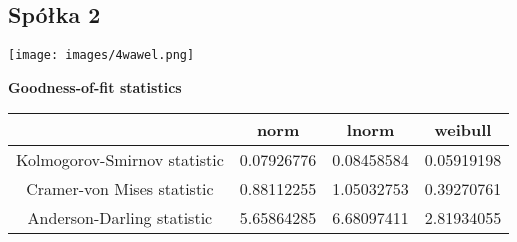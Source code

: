 \documentclass[a4paper,11pt]{article}
\begin{document}
\subsection{Spółka 2}
\begin{center}
\texttt{[image: images/4wawel.png]}
\end{center}

\begin{center} 
{\textbf{Goodness-of-fit statistics}}\\
\begin{tabular}{ |c | c | c| c | } 
  \hline
    &  norm &  lnorm &  weibull  \\ 
  \hline
  Kolmogorov-Smirnov statistic  & 0.07926776 &  0.08458584 & 0.05919198 \\ 
  \hline
   Cramer-von Mises statistic  & 0.88112255    &   1.05032753 &  0.39270761 \\ 
  \hline
   Anderson-Darling statistic  &  5.65864285     & 6.68097411 & 2.81934055 \\ 
  \hline
\end{tabular}
\end{center}

\end{document}
